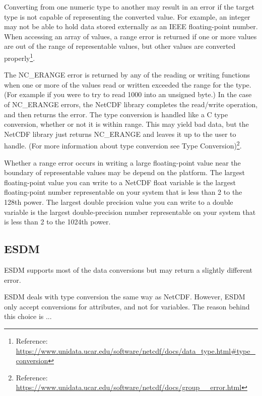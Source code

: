 Converting from one numeric type to another may result in an error if the target type is not capable of representing the converted value. For example, an integer may not be able to hold data stored externally as an IEEE floating-point number. When accessing an array of values, a range error is returned if one or more values are out of the range of representable values, but other values are converted properly\footnote{Reference: \url{https://www.unidata.ucar.edu/software/netcdf/docs/data_type.html\#type_conversion}}.

The NC\_ERANGE error is returned by any of the reading or writing functions when one or more of the values read or written exceeded the range for the type. (For example if you were to try to read 1000 into an unsigned byte.) In the case of NC\_ERANGE errors, the NetCDF library completes the read/write operation, and then returns the error. The type conversion is handled like a C type conversion, whether or not it is within range. This may yield bad data, but the NetCDF library just returns NC\_ERANGE and leaves it up to the user to handle. (For more information about type conversion see Type Conversion)\footnote{Reference: \url{https://www.unidata.ucar.edu/software/netcdf/docs/group__error.html}}.

\begin{framed}

\tocheck

Whether a range error occurs in writing a large floating-point value near the boundary of representable values may be depend on the platform. The largest floating-point value you can write to a NetCDF float variable is the largest floating-point number representable on your system that is less than 2 to the 128th power. The largest double precision value you can write to a double variable is the largest double-precision number representable on your system that is less than 2 to the 1024th power.

\end{framed}

\subsection{ESDM}


ESDM supports most of the data conversions but may return a slightly different error.

ESDM deals with type conversion the same way as NetCDF. However, ESDM only accept conversions for attributes, and not for variables. The reason behind this choice is ...

